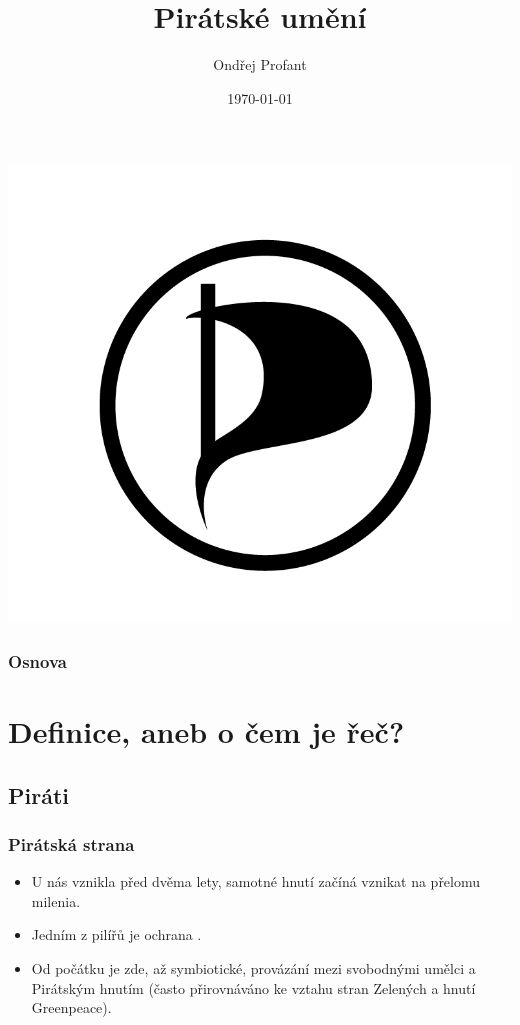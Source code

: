 \documentclass[xetex]{beamer}
\title{Pirátské umění}
\author{Ondřej Profant}
\institute[Piráti]{Česká pirátská strana}
\date{\today}
\begin{document}
\begin{frame}
  \titlepage
  \includegraphics[scale=0.4]{plachta_s_okrajem.png}
\end{frame}

\begin{frame}
  \frametitle{Osnova}
  \tableofcontents
\end{frame}

\section{Definice, aneb o čem je řeč?}

\subsection{Piráti}
\begin{frame}
 \frametitle{Pirátská strana}
 \begin{itemize}
  \item U nás vznikla před dvěma lety, samotné hnutí začíná vznikat na přelomu milenia.

  \item Jedním z pilířů  je ochrana .

  \item Od počátku je zde, až symbiotické, provázání mezi svobodnými umělci a Pirátským hnutím (často přirovnáváno ke vztahu stran Zelených a hnutí Greenpeace).
  \end{itemize}
\end{frame}
\end{document}
